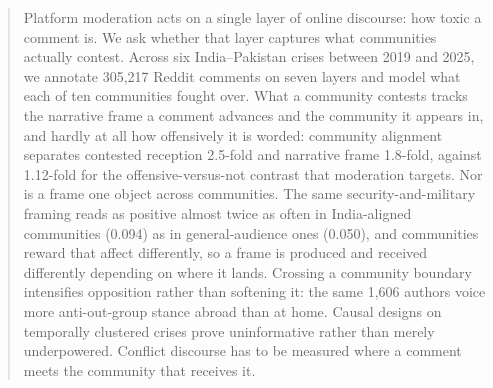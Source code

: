 \begin{abstract}
  Platform moderation acts on a single layer of online discourse: how toxic a
  comment is. We ask whether that layer captures what communities actually
  contest. Across six India--Pakistan crises between 2019 and 2025, we annotate
  305,217 Reddit comments on seven layers and model what each of ten communities
  fought over. What a community contests tracks the narrative frame a comment
  advances and the community it appears in, and hardly at all how offensively it
  is worded: community alignment separates contested reception 2.5-fold and
  narrative frame 1.8-fold, against 1.12-fold for the offensive-versus-not
  contrast that moderation targets. Nor is a frame one object across communities.
  The same security-and-military framing reads as positive almost twice as often
  in India-aligned communities (0.094) as in general-audience ones (0.050), and
  communities reward that affect differently, so a frame is produced and received
  differently depending on where it lands. Crossing a community boundary
  intensifies opposition rather than softening it: the same 1,606 authors voice
  more anti-out-group stance abroad than at home. Causal designs on temporally
  clustered crises prove uninformative rather than merely underpowered. Conflict
  discourse has to be measured where a comment meets the community that receives
  it.
\end{abstract}

